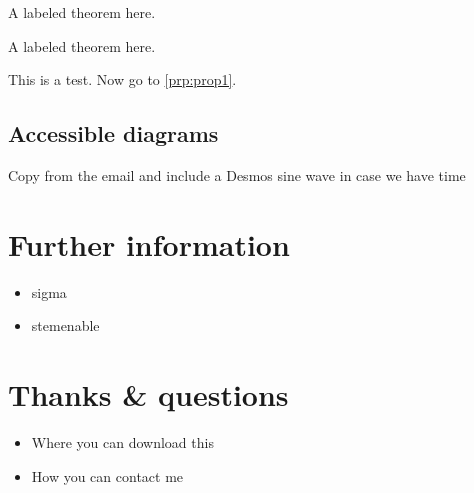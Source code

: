 \documentclass[
  12pt,
  english,
  a4paper]{extarticle}
\providecommand{\tightlist}{%
  \setlength{\itemsep}{0pt}\setlength{\parskip}{0pt}}
\theoremstyle{plain}
\theoremstyle{plain}
\theoremstyle{plain}
\theoremstyle{plain}
\theoremstyle{plain}
\theoremstyle{definition}
\theoremstyle{definition}
\theoremstyle{definition}
\theoremstyle{remark}
\let\BeginKnitrBlock\begin \let\EndKnitrBlock\end
\renewcommand{\;}{\,}
\begin{document}
\BeginKnitrBlock{Thought}
\protect\hypertarget{Thought:tho1}{}{ \label{tho:tho1} }A labeled theorem here.
\EndKnitrBlock{Thought}

\BeginKnitrBlock{Nugget}
\protect\hypertarget{Nugget:nug1}{}{ \label{nug:nug1} }A labeled theorem here.
\EndKnitrBlock{Nugget}

This is a test. Now go to \ref{prp:prop1}.

\hypertarget{accessible-diagrams}{%
\subsection{Accessible diagrams}\label{accessible-diagrams}}

Copy from the email and include a Desmos sine wave in case we have time

\hypertarget{further-information}{%
\section{Further information}\label{further-information}}

\begin{itemize}
\tightlist
\item
  sigma
\item
  stemenable
\end{itemize}

\hypertarget{thanks-questions}{%
\section{Thanks \& questions}\label{thanks-questions}}

\begin{itemize}
\tightlist
\item
  Where you can download this
\item
  How you can contact me
\end{itemize}
\end{document}
